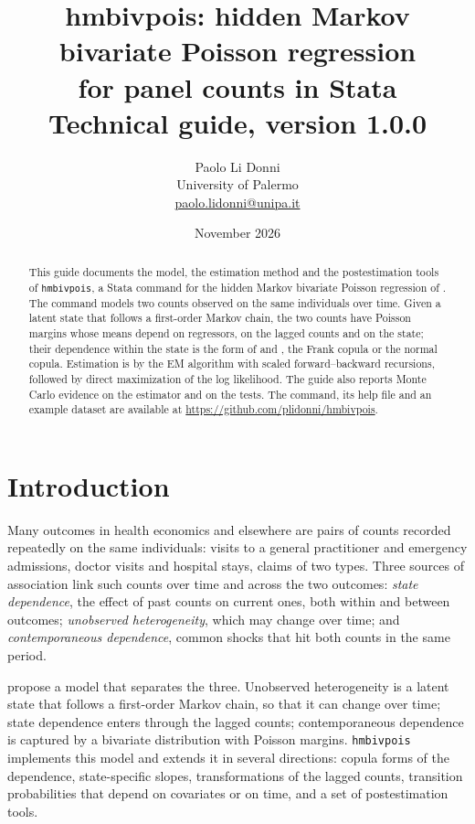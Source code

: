 \documentclass[11pt,a4paper]{article}
\title{\textbf{hmbivpois}: hidden Markov bivariate Poisson regression\\ for panel counts in Stata\\[0.4em]
\large Technical guide, version 1.0.0}
\author{Paolo Li Donni\\ University of Palermo\\ \href{mailto:paolo.lidonni@unipa.it}{paolo.lidonni@unipa.it}}
\date{November 2026}
\newcommand{\cmd}[1]{\texttt{#1}}
\begin{document}
\maketitle

\begin{abstract}
\noindent This guide documents the model, the estimation method and the postestimation tools of
\cmd{hmbivpois}, a Stata command for the hidden Markov bivariate Poisson regression of
\citet{laudicella2022}. The command models two counts observed on the same individuals over time. Given
a latent state that follows a first-order Markov chain, the two counts have Poisson margins whose
means depend on regressors, on the lagged counts and on the state; their dependence within the state
is the form of \citet{lakshminarayana1999} and \citet{famoye2010}, the Frank copula or the normal
copula. Estimation is by the EM algorithm with scaled forward--backward recursions, followed by direct
maximization of the log likelihood. The guide also reports Monte Carlo evidence on the estimator and
on the tests. The command, its help file and an example dataset are available at
\url{https://github.com/plidonni/hmbivpois}.
\end{abstract}

\tableofcontents
\bigskip

\section{Introduction}

Many outcomes in health economics and elsewhere are pairs of counts recorded repeatedly on the same
individuals: visits to a general practitioner and emergency admissions, doctor visits and hospital
stays, claims of two types. Three sources of association link such counts over time and across the two
outcomes: \emph{state dependence}, the effect of past counts on current ones, both within and between
outcomes; \emph{unobserved heterogeneity}, which may change over time; and \emph{contemporaneous
dependence}, common shocks that hit both counts in the same period.

\citet{laudicella2022} propose a model that separates the three. Unobserved heterogeneity is a latent
state that follows a first-order Markov chain, so that it can change over time; state dependence enters
through the lagged counts; contemporaneous dependence is captured by a bivariate distribution with
Poisson margins. \cmd{hmbivpois} implements this model and extends it in several directions: copula
forms of the dependence, state-specific slopes, transformations of the lagged counts, transition
probabilities that depend on covariates or on time, and a set of postestimation tools.
\end{document}

